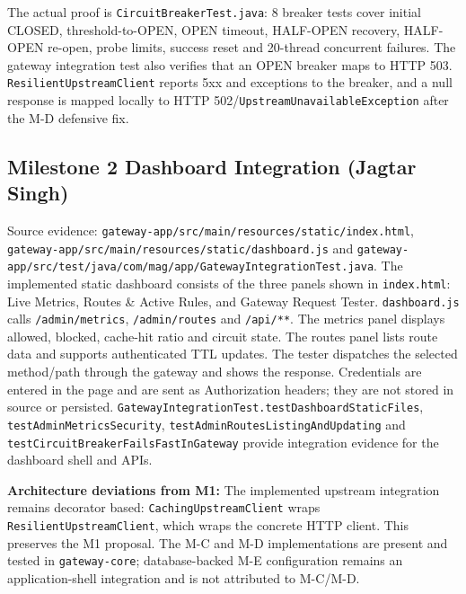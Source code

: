 \documentclass[12pt,a4paper]{article}
\newcommand{\evidence}[1]{\texttt{#1}}
\begin{document}
The actual proof is \texttt{CircuitBreakerTest.java}: 8 breaker tests cover initial CLOSED, threshold-to-OPEN, OPEN timeout, HALF-OPEN recovery, HALF-OPEN re-open, probe limits, success reset and 20-thread concurrent failures. The gateway integration test also verifies that an OPEN breaker maps to HTTP 503. \texttt{ResilientUpstreamClient} reports 5xx and exceptions to the breaker, and a null response is mapped locally to HTTP 502/\texttt{UpstreamUnavailableException} after the M-D defensive fix.

\subsection{Milestone 2 Dashboard Integration (Jagtar Singh)}
Source evidence: \evidence{gateway-app/src/main/resources/static/index.html}, \evidence{gateway-app/src/main/resources/static/dashboard.js} and \evidence{gateway-app/src/test/java/com/mag/app/GatewayIntegrationTest.java}. The implemented static dashboard consists of the three panels shown in \texttt{index.html}: Live Metrics, Routes \& Active Rules, and Gateway Request Tester. \texttt{dashboard.js} calls \texttt{/admin/metrics}, \texttt{/admin/routes} and \texttt{/api/**}. The metrics panel displays allowed, blocked, cache-hit ratio and circuit state. The routes panel lists route data and supports authenticated TTL updates. The tester dispatches the selected method/path through the gateway and shows the response. Credentials are entered in the page and are sent as Authorization headers; they are not stored in source or persisted. \texttt{GatewayIntegrationTest.testDashboardStaticFiles}, \texttt{testAdminMetricsSecurity}, \texttt{testAdminRoutesListingAndUpdating} and \texttt{testCircuitBreakerFailsFastInGateway} provide integration evidence for the dashboard shell and APIs.

\textbf{Architecture deviations from M1:} The implemented upstream integration remains decorator based: \texttt{CachingUpstreamClient} wraps \texttt{ResilientUpstreamClient}, which wraps the concrete HTTP client. This preserves the M1 proposal. The M-C and M-D implementations are present and tested in \texttt{gateway-core}; database-backed M-E configuration remains an application-shell integration and is not attributed to M-C/M-D.
\end{document}
